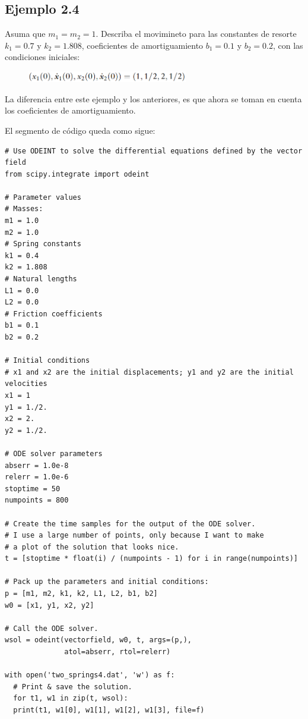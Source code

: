 \documentclass[a4paper]{article}
\begin{document}
\newpage
\subsection{Ejemplo 2.4}
Asuma que $m_1=m_2=1$. Describa el movimineto para las constantes de resorte $k_1=0.7$ y $k_2=1.808$, coeficientes de amortiguamiento $b_1=0.1$ y $b_2=0.2$, con las condiciones iniciales:

\begin{figure}[ht!]
\centering 
\includegraphics[width=70mm]{Ejemplo2_4.PNG}
\end{figure}

La diferencia entre este ejemplo y los anteriores, es que ahora se toman en cuenta los coeficientes de amortiguamiento.

El segmento de código queda como sigue:

\begin{verbatim}
# Use ODEINT to solve the differential equations defined by the vector field
from scipy.integrate import odeint

# Parameter values
# Masses:
m1 = 1.0
m2 = 1.0
# Spring constants
k1 = 0.4
k2 = 1.808
# Natural lengths
L1 = 0.0
L2 = 0.0
# Friction coefficients
b1 = 0.1
b2 = 0.2

# Initial conditions
# x1 and x2 are the initial displacements; y1 and y2 are the initial velocities
x1 = 1
y1 = 1./2.
x2 = 2.
y2 = 1./2.

# ODE solver parameters
abserr = 1.0e-8
relerr = 1.0e-6
stoptime = 50
numpoints = 800

# Create the time samples for the output of the ODE solver.
# I use a large number of points, only because I want to make
# a plot of the solution that looks nice.
t = [stoptime * float(i) / (numpoints - 1) for i in range(numpoints)]

# Pack up the parameters and initial conditions:
p = [m1, m2, k1, k2, L1, L2, b1, b2]
w0 = [x1, y1, x2, y2]

# Call the ODE solver.
wsol = odeint(vectorfield, w0, t, args=(p,),
              atol=abserr, rtol=relerr)

with open('two_springs4.dat', 'w') as f:
  # Print & save the solution.
  for t1, w1 in zip(t, wsol):
  print(t1, w1[0], w1[1], w1[2], w1[3], file=f)
\end{verbatim}
\end{document}
